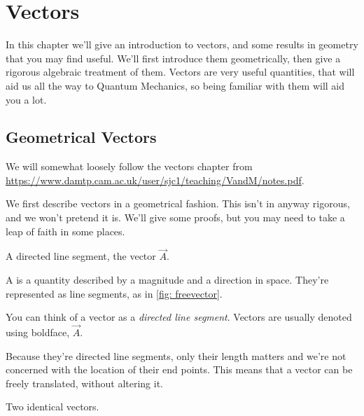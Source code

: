 \setlength{\chnumsep}{14em}
\chapter{Vectors}

\begin{overview}
In this chapter we'll give an introduction to vectors, and some results in
geometry that you may find useful. We'll first introduce them geometrically, then
give a rigorous algebraic treatment of them. Vectors are very useful quantities,
that will aid us all the way to Quantum Mechanics, so being familiar with them will aid you 
a lot. 
\end{overview}


\section{Geometrical Vectors}

We will somewhat loosely follow the vectors chapter from \url{https://www.damtp.cam.ac.uk/user/sjc1/teaching/VandM/notes.pdf}.


We first describe vectors in a geometrical fashion. This isn't in anyway rigorous, and we won't 
pretend it is. We'll give some proofs, but you may need to take a leap of faith in some places.

\begin{marginfigure}
\caption{A directed line segment, the vector \(\vec{A}\).}
\label{fig: freevector}
\vspace{4em}
\end{marginfigure}

\begin{definition}
  A  is a quantity described by a magnitude and a direction in space. They're
  represented as line segments, as in \cref{fig: freevector}.  
\end{definition}
You can think of a vector as a \emph{directed line segment}.
Vectors are usually denoted using boldface, \(\vec{A}\). 

Because they're directed line segments, only their length matters and
we’re not concerned with the location of their end points. This means that a
vector can be freely translated, without altering it.

\begin{marginfigure}
\caption{Two identical vectors.}
\end{marginfigure}


